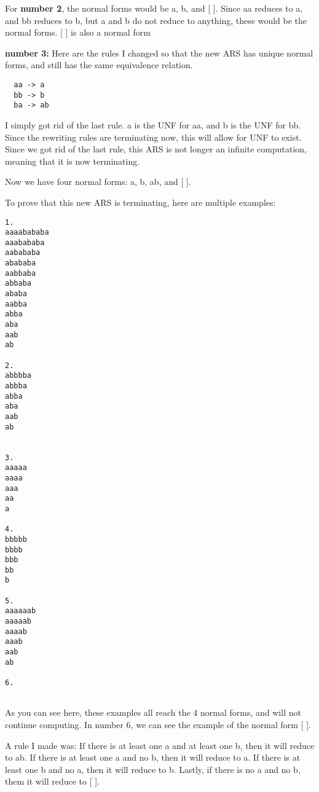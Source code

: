 \documentclass{article}
\theoremstyle{theorem}
\theoremstyle{definition}
\theoremstyle{remark}
\begin{document}
\noindent\newline\newline For \textbf{number 2}, the normal forms would be a, b, and [ ]. Since aa reduces to a, and bb reduces to b, but a and b do not reduce to anything, these would be the normal forms. [ ] is also a normal form

\noindent\newline\newline \textbf{number 3:} Here are the rules I changed so that the new ARS has unique normal forms, and still has the same equivalence relation.

\begin{verbatim}
  aa -> a
  bb -> b
  ba -> ab
\end{verbatim}

\noindent I simply got rid of the last rule. a is the UNF for aa, and b is the UNF for bb. Since the rewriting rules are terminating now, this will allow for UNF to exist. Since we got rid of the last rule, this ARS is not longer an infinite computation, meaning that it is now terminating.

\noindent\newline Now we have four normal forms: a, b, ab, and [ ].

\noindent\newline To prove that this new ARS is terminating, here are multiple examples:

\begin{verbatim}
1. 
aaaabababa
aaabababa
aabababa
abababa
aabbaba
abbaba
ababa
aabba
abba
aba
aab
ab

2.
abbbba
abbba
abba
aba
aab
ab


3.
aaaaa
aaaa
aaa
aa
a

4.
bbbbb
bbbb
bbb
bb
b

5.
aaaaaab
aaaaab
aaaab
aaab
aab
ab

6.


\end{verbatim}

\noindent\newline As you can see here, these examples all reach the 4 normal forms, and will not continue computing. In number 6, we can see the example of the normal form [ ].

\noindent\newline A rule I made was: If there is at least one a and at least one b, then it will reduce to ab. If there is at least one a and no b, then it will reduce to a. If there is at least one b and no a, then it will reduce to b. Lastly, if there is no a and no b, them it will reduce to [ ].
\end{document}
